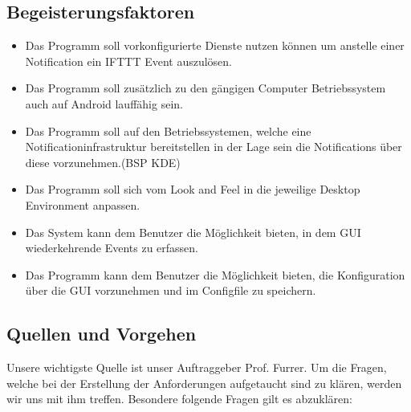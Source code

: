 \documentclass[11pt,titelpage]{scrartcl}
\begin{document}
\subsection{Begeisterungsfaktoren}


\begin{itemize}
\item
Das Programm soll vorkonfigurierte Dienste nutzen können um anstelle einer Notification  ein IFTTT Event auszulösen.

\item
Das Programm soll zusätzlich zu den gängigen Computer Betriebssystem auch auf Android lauffähig sein.


\item
Das Programm soll auf den Betriebssystemen, welche eine Notificationinfrastruktur bereitstellen  in der Lage sein die Notifications über diese vorzunehmen.(BSP KDE)

\item
Das Programm soll sich vom Look and Feel in die jeweilige Desktop Environment anpassen.
\item
Das System kann dem Benutzer die Möglichkeit bieten, in dem GUI wiederkehrende Events zu erfassen.
\item
Das Programm kann dem Benutzer die Möglichkeit bieten, die Konfiguration über die GUI vorzunehmen und im Configfile zu speichern.

\end{itemize}






\subsection{Quellen und Vorgehen}
Unsere wichtigste Quelle ist unser Auftraggeber Prof. Furrer. Um die Fragen, welche bei der Erstellung der Anforderungen aufgetaucht sind zu klären, werden wir uns mit ihm treffen.
Besondere folgende Fragen gilt es abzuklären:
\end{document}
